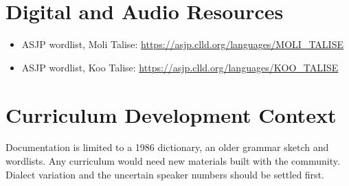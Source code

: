 \documentclass[12pt]{article}
\begin{document}
\section{Digital and Audio Resources}
\begin{itemize}
\item ASJP wordlist, Moli Talise: \url{https://asjp.clld.org/languages/MOLI_TALISE}
\item ASJP wordlist, Koo Talise: \url{https://asjp.clld.org/languages/KOO_TALISE}
\end{itemize}

\section{Curriculum Development Context}
Documentation is limited to a 1986 dictionary, an older grammar sketch and wordlists. Any curriculum would need new materials built with the community. Dialect variation and the uncertain speaker numbers should be settled first.
\end{document}
